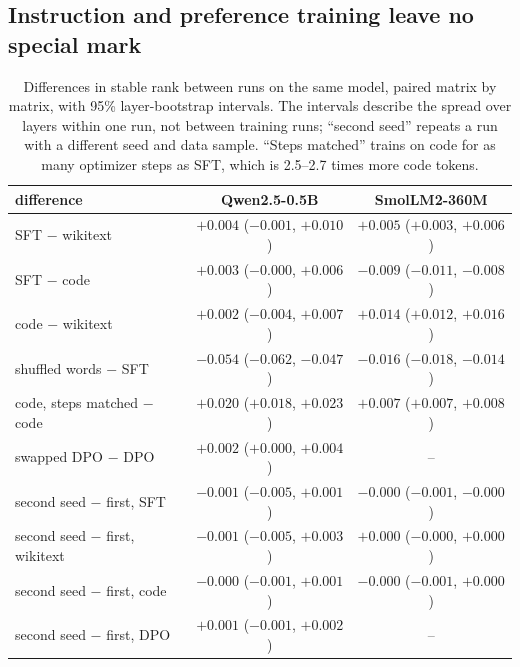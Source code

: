 \subsection{Instruction and preference training leave no special mark}
\label{sec:controls}

\begin{table}[t]
\caption{Differences in stable rank between runs on the same model, paired
matrix by matrix, with 95\% layer-bootstrap intervals. The intervals describe
the spread over layers within one run, not between training runs; ``second
seed'' repeats a run with a different seed and data sample. ``Steps matched''
trains on code for as many optimizer steps as SFT, which is 2.5--2.7 times more code
tokens.}
\label{tab:paired}
\begin{center}
\small
\begin{tabular}{lcc}
\toprule
difference & Qwen2.5-0.5B & SmolLM2-360M \\
\midrule
SFT $-$ wikitext            & $+0.004$ ($-0.001$, $+0.010$) & $+0.005$ ($+0.003$, $+0.006$) \\
SFT $-$ code                & $+0.003$ ($-0.000$, $+0.006$) & $-0.009$ ($-0.011$, $-0.008$) \\
code $-$ wikitext           & $+0.002$ ($-0.004$, $+0.007$) & $+0.014$ ($+0.012$, $+0.016$) \\
shuffled words $-$ SFT      & $-0.054$ ($-0.062$, $-0.047$) & $-0.016$ ($-0.018$, $-0.014$) \\
code, steps matched $-$ code & $+0.020$ ($+0.018$, $+0.023$) & $+0.007$ ($+0.007$, $+0.008$) \\
swapped DPO $-$ DPO         & $+0.002$ ($+0.000$, $+0.004$) & -- \\
\midrule
second seed $-$ first, SFT      & $-0.001$ ($-0.005$, $+0.001$) & $-0.000$ ($-0.001$, $-0.000$) \\
second seed $-$ first, wikitext & $-0.001$ ($-0.005$, $+0.003$) & $+0.000$ ($-0.000$, $+0.000$) \\
second seed $-$ first, code     & $-0.000$ ($-0.001$, $+0.001$) & $-0.000$ ($-0.001$, $+0.000$) \\
second seed $-$ first, DPO      & $+0.001$ ($-0.001$, $+0.002$) & -- \\
\bottomrule
\end{tabular}
\end{center}
\end{table}

